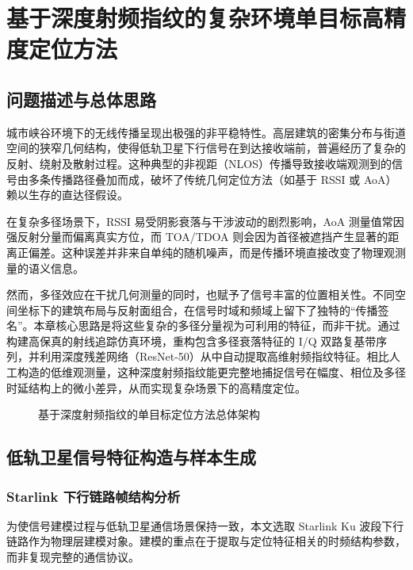\chapter{基于深度射频指纹的复杂环境单目标高精度定位方法}
\label{ch:single_target}

\section{问题描述与总体思路}

城市峡谷环境下的无线传播呈现出极强的非平稳特性。高层建筑的密集分布与街道空间的狭窄几何结构，使得低轨卫星下行信号在到达接收端前，普遍经历了复杂的反射、绕射及散射过程。这种典型的非视距（NLOS）传播导致接收端观测到的信号由多条传播路径叠加而成，破坏了传统几何定位方法（如基于 RSSI 或 AoA）赖以生存的直达径假设。

在复杂多径场景下，RSSI 易受阴影衰落与干涉波动的剧烈影响，AoA 测量值常因强反射分量而偏离真实方位，而 TOA/TDOA 则会因为首径被遮挡产生显著的距离正偏差。这种误差并非来自单纯的随机噪声，而是传播环境直接改变了物理观测量的语义信息。

然而，多径效应在干扰几何测量的同时，也赋予了信号丰富的位置相关性。不同空间坐标下的建筑布局与反射面组合，在信号时域和频域上留下了独特的“传播签名”。本章核心思路是将这些复杂的多径分量视为可利用的特征，而非干扰。通过构建高保真的射线追踪仿真环境，重构包含多径衰落特征的 I/Q 双路复基带序列，并利用深度残差网络（ResNet-50）从中自动提取高维射频指纹特征。相比人工构造的低维观测量，这种深度射频指纹能更完整地捕捉信号在幅度、相位及多径时延结构上的微小差异，从而实现复杂场景下的高精度定位。

\begin{figure}[htbp]
    \centering
    \vspace{4cm}
    \caption{基于深度射频指纹的单目标定位方法总体架构}
    \label{fig:ch3_overall_architecture}
\end{figure}

\section{低轨卫星信号特征构造与样本生成}

\subsection{Starlink 下行链路帧结构分析}

为使信号建模过程与低轨卫星通信场景保持一致，本文选取 Starlink Ku 波段下行链路作为物理层建模对象。建模的重点在于提取与定位特征相关的时频结构参数，而非复现完整的通信协议。

